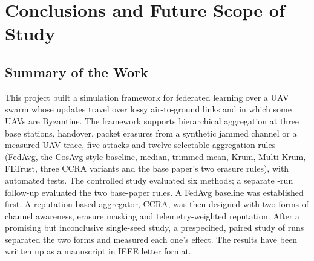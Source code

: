 \chapter{Conclusions and Future Scope of Study}
\label{ch:conclusions}

\section{Summary of the Work}
This project built a simulation framework for federated learning over a UAV swarm
whose updates travel over lossy air-to-ground links and in which some UAVs are
Byzantine. The framework supports hierarchical aggregation at three base stations,
handover, packet erasures from a synthetic jammed channel or a measured UAV trace,
five attacks and twelve selectable aggregation rules (FedAvg, the CosAvg-style
baseline, median, trimmed mean, Krum, Multi-Krum, FLTrust, three CCRA variants and the
base paper's two erasure rules), with automated tests. The controlled study evaluated
six methods; a separate \BpNumRuns-run follow-up evaluated the two base-paper rules.
A FedAvg
baseline was established first. A reputation-based aggregator, CCRA, was then
designed with two forms of channel awareness, erasure masking and telemetry-weighted
reputation. After a promising but inconclusive single-seed study, a prespecified,
paired study of \NumRuns{} runs separated the two forms and measured each one's
effect. The results have been written up as a manuscript in IEEE letter format.

